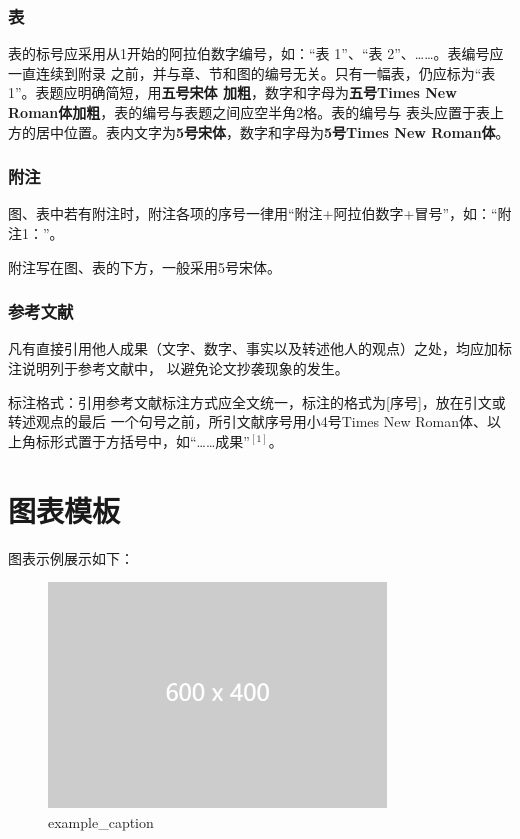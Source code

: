 \documentclass[zihao=-4]{ctexart}
\begin{document}
\begin{spacing}{1.5}
\subsubsection{表}
表的标号应采用从1开始的阿拉伯数字编号，如：“表 1”、“表 2”、……。表编号应一直连续到附录
之前，并与章、节和图的编号无关。只有一幅表，仍应标为“表 1”。表题应明确简短，用\textbf{五号宋体
加粗}，数字和字母为\textbf{五号Times New Roman体加粗}，表的编号与表题之间应空半角2格。表的编号与
表头应置于表上方的居中位置。表内文字为\textbf{5号宋体}，数字和字母为\textbf{5号Times New Roman体}。  

\subsubsection{附注}
图、表中若有附注时，附注各项的序号一律用“附注+阿拉伯数字+冒号”，如：“附注1：”。

附注写在图、表的下方，一般采用5号宋体。

\subsubsection{参考文献}
凡有直接引用他人成果（文字、数字、事实以及转述他人的观点）之处，均应加标注说明列于参考文献中，
以避免论文抄袭现象的发生。

标注格式：引用参考文献标注方式应全文统一，标注的格式为[序号]，放在引文或转述观点的最后
一个句号之前，所引文献序号用小4号Times New Roman体、以上角标形式置于方括号中，如“……成果”$^{[1]}$。
\section{图表模板}
图表示例展示如下：

\begin{figure}[H] %
    \centering %
    \includegraphics[width=0.8\textwidth]{example-image-2.png} %
    \caption{example\_caption} %
    \label{example_label} %
\end{figure}


\end{spacing}
\end{document}
